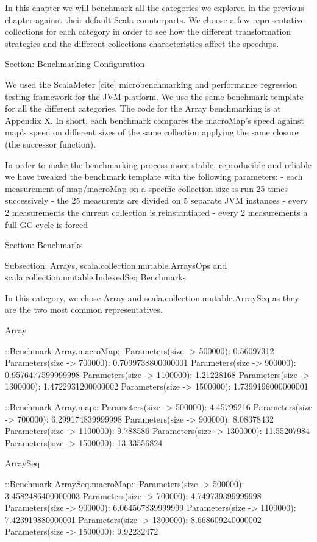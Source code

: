 In this chapter we will benchmark all the categories we explored in
the previous chapter against their default Scala counterparts. We choose a few
representative collections for each category in order to see how the different
transformation strategies and the different collections characteristics affect
the speedups.

Section: Benchmarking Configuration

We used the ScalaMeter [cite] microbenchmarking and performance regression
testing framework for the JVM platform. We use the same benchmark template for
all the different categories. The code for the Array benchmarking is at Appendix
X. In short, each benchmark compares the macroMap's speed against map's speed
on different sizes of the same collection applying the same closure (the
successor function).

In order to make the benchmarking process more stable, reproducible and reliable
we have tweaked the benchmark template with the following parameters:
- each measurement of map/macroMap on a specific collection size is run 25
times successively
- the 25 measurents are divided on 5 separate JVM instances
- every 2 measurements the current collection is reinstantiated
- every 2 measurements a full GC cycle is forced


Section: Benchmarks

Subsection: Arrays, scala.collection.mutable.ArraysOps and
scala.collection.mutable.IndexedSeq Benchmarks

In this category, we chose Array and scala.collection.mutable.ArraySeq as they
are the two most common representatives.

Array

::Benchmark Array.macroMap::
Parameters(size -> 500000): 0.56097312
Parameters(size -> 700000): 0.7099738800000001
Parameters(size -> 900000): 0.9576477599999998
Parameters(size -> 1100000): 1.21228168
Parameters(size -> 1300000): 1.4722931200000002
Parameters(size -> 1500000): 1.7399196000000001

::Benchmark Array.map::
Parameters(size -> 500000): 4.45799216
Parameters(size -> 700000): 6.299174839999998
Parameters(size -> 900000): 8.08378432
Parameters(size -> 1100000): 9.788586
Parameters(size -> 1300000): 11.55207984
Parameters(size -> 1500000): 13.33556824


ArraySeq

::Benchmark ArraySeq.macroMap::
Parameters(size -> 500000): 3.4582486400000003
Parameters(size -> 700000): 4.749739399999998
Parameters(size -> 900000): 6.064567839999999
Parameters(size -> 1100000): 7.423919880000001
Parameters(size -> 1300000): 8.668609240000002
Parameters(size -> 1500000): 9.92232472

